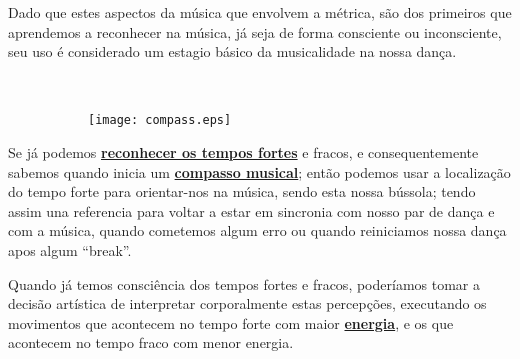 Dado que estes aspectos da música que envolvem a métrica, são dos primeiros que aprendemos a reconhecer na música,
já seja de forma consciente ou inconsciente,
seu uso é considerado um estagio básico da musicalidade na nossa dança.
 
\begin{example}~\\
\noindent
\begin{minipage}[t]{0.25\linewidth}
\begin{figure}[H]
  \centering
  \begin{subfigure}[t]{0.9\linewidth}
    \texttt{[image: compass.eps]}
  \end{subfigure}
\end{figure}
\end{minipage}
\begin{minipage}[t]{0.75\linewidth}
Se já podemos \hyperref[subsec:perceberTF1]{\textbf{reconhecer os tempos fortes}} e fracos, 
e consequentemente sabemos quando inicia um \hyperref[sec:compaso]{\textbf{compasso musical}};
então podemos usar a localização do tempo forte para orientar-nos na música,
sendo esta nossa bússola;
tendo assim una referencia para voltar a estar em sincronia com  nosso par de dança e com a música, 
quando cometemos algum erro ou quando reiniciamos nossa dança apos algum ``break''.
\end{minipage}
\end{example}


\begin{example}
Quando já temos consciência dos tempos fortes e fracos,
poderíamos tomar a decisão artística de interpretar corporalmente estas percepções, 
executando os movimentos que acontecem no tempo forte com maior \hyperref[sec:musicalidadenergia]{\textbf{energia}},
e os que acontecem no tempo fraco com menor energia.
\end{example}

